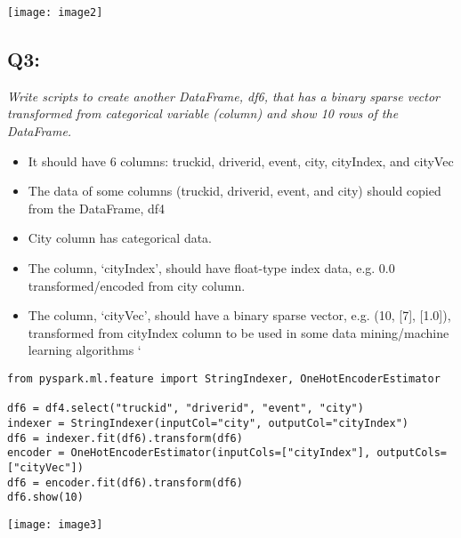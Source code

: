 \documentclass[]{article}
\begin{document}
\texttt{[image: image2]}

\clearpage
\subsection*{Q3: }
\emph{Write scripts to create another DataFrame, df6, 
	that has a binary sparse vector transformed from 
	categorical variable (column) and show 10 rows of the DataFrame.} \\
	\begin{itemize}[before=\itshape,font=\normalfont]
		\item It should have 6 columns: truckid, driverid, event, city, cityIndex, and cityVec
		\item The data of some columns (truckid, driverid, event, and city) should copied from the DataFrame, df4
		\item City column has categorical data.
		\item The column, ‘cityIndex’, should have float-type index data, e.g. 0.0 transformed/encoded from city column.
		\item The column, ‘cityVec’, should have a binary sparse vector, e.g. (10, [7], [1.0]), transformed from cityIndex column to be used in some data mining/machine learning algorithms
`	\end{itemize} 


\begin{verbatim}
from pyspark.ml.feature import StringIndexer, OneHotEncoderEstimator

df6 = df4.select("truckid", "driverid", "event", "city")
indexer = StringIndexer(inputCol="city", outputCol="cityIndex")
df6 = indexer.fit(df6).transform(df6)
encoder = OneHotEncoderEstimator(inputCols=["cityIndex"], outputCols=["cityVec"])
df6 = encoder.fit(df6).transform(df6)
df6.show(10)
\end{verbatim}

\texttt{[image: image3]}
\end{document}
